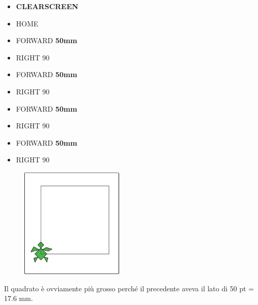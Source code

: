 \vskip 1cm

\begin{scriptsize}
\begin{minipage}{0.45\textwidth}
\begin{itemize}[itemsep=-3pt,parsep=2pt]
\item[] \hspace{0.5cm} \textbf{CLEARSCREEN}
\item[] \hspace{0.5cm} HOME
\item[] \hspace{0.5cm} FORWARD \textbf{50mm}
\item[] \hspace{0.5cm} RIGHT 90
\item[] \hspace{0.5cm} FORWARD \textbf{50mm}
\item[] \hspace{0.5cm} RIGHT 90
\item[] \hspace{0.5cm} FORWARD \textbf{50mm}
\item[] \hspace{0.5cm} RIGHT 90
\item[] \hspace{0.5cm} FORWARD \textbf{50mm} 
\item[] \hspace{0.5cm} RIGHT 90     
\end{itemize}
\end{minipage}
\end{scriptsize}
\begin{minipage}{0.5\textwidth}
\begin{figure}[H]
   \includegraphics[width=5.0cm,trim=4 4 8 4,clip]{./images/disegnare/disegnare-4.png}
   \label{dis-4}
\end{figure}
\end{minipage} \hfill

\vskip 1cm

Il quadrato è ovviamente più grosso perché il precedente aveva il lato di 50 pt = 17.6 mm. 

